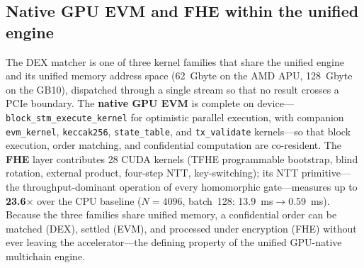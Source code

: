 \subsection{Native GPU EVM and FHE within the unified engine}

The DEX matcher is one of three kernel families that share the unified engine and its unified
memory address space (\SI{62}{\giga byte} on the AMD APU, \SI{128}{\giga byte} on the GB10),
dispatched through a single stream so that no result crosses a PCIe boundary. The
\textbf{native GPU EVM} is complete on device---\texttt{block\_stm\_execute\_kernel} for
optimistic parallel execution, with companion \texttt{evm\_kernel}, \texttt{keccak256},
\texttt{state\_table}, and \texttt{tx\_validate} kernels---so that block execution, order
matching, and confidential computation are co-resident. The \textbf{FHE} layer contributes 28
CUDA kernels (TFHE programmable bootstrap, blind rotation, external product, four-step NTT,
key-switching); its NTT primitive---the throughput-dominant operation of every homomorphic
gate---measures up to \textbf{23.6$\times$} over the CPU baseline ($N{=}4096$, batch~128:
\SI{13.9}{\milli\second}$\to$\SI{0.59}{\milli\second}). Because the three families share unified
memory, a confidential order can be matched (DEX), settled (EVM), and processed under encryption
(FHE) without ever leaving the accelerator---the defining property of the unified GPU-native
multichain engine.
